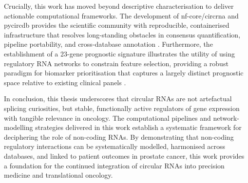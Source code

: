 Crucially, this work has moved beyond descriptive characterisation to deliver actionable computational frameworks. The development of nf-core/circrna and pycircdb provides the scientific community with reproducible, containerised infrastructure that resolves long-standing obstacles in consensus quantification, pipeline portability, and cross-database annotation \cite{Digby2023Dec, Digby2024Dec}. Furthermore, the establishment of a 23-gene prognostic signature illustrates the utility of using regulatory RNA networks to constrain feature selection, providing a robust paradigm for biomarker prioritisation that captures a largely distinct prognostic space relative to existing clinical panels \cite{Mortensen2015Nov, Harrell1996Feb, Steyerberg2015Apr}.

In conclusion, this thesis underscores that circular RNAs are not artefactual splicing curiosities, but stable, functionally active regulators of gene expression with tangible relevance in oncology. The computational pipelines and network-modelling strategies delivered in this work establish a systematic framework for deciphering the role of non-coding RNAs. By demonstrating that non-coding regulatory interactions can be systematically modelled, harmonised across databases, and linked to patient outcomes in prostate cancer, this work provides a foundation for the continued integration of circular RNAs into precision medicine and translational oncology. 
